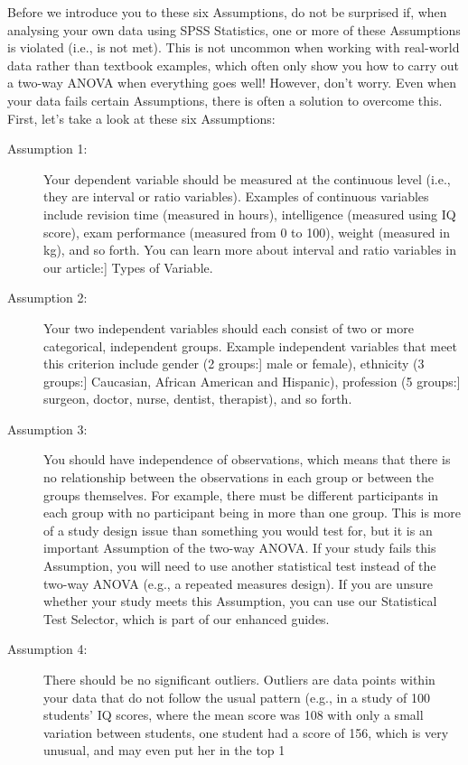 \documentclass[]{article}
\begin{document}
Before we introduce you to these six Assumptions, do not be surprised if, when analysing your own data using SPSS Statistics, one or more of these Assumptions is violated (i.e., is not met). This is not uncommon when working with real-world data rather than textbook examples, which often only show you how to carry out a two-way ANOVA when everything goes well! However, don’t worry. Even when your data fails certain Assumptions, there is often a solution to overcome this. First, let’s take a look at these six Assumptions:
\begin{description}
\item[ Assumption 1:] Your dependent variable should be measured at the continuous level (i.e., they are interval or ratio variables). Examples of continuous variables include revision time (measured in hours), intelligence (measured using IQ score), exam performance (measured from 0 to 100), weight (measured in kg), and so forth. You can learn more about interval and ratio variables in our article:] Types of Variable.
\item[ Assumption 2:] Your two independent variables should each consist of two or more categorical, independent groups. Example independent variables that meet this criterion include gender (2 groups:] male or female), ethnicity (3 groups:] Caucasian, African American and Hispanic), profession (5 groups:] surgeon, doctor, nurse, dentist, therapist), and so forth.
\item[ Assumption 3:] You should have independence of observations, which means that there is no relationship between the observations in each group or between the groups themselves. For example, there must be different participants in each group with no participant being in more than one group. This is more of a study design issue than something you would test for, but it is an important Assumption of the two-way ANOVA. If your study fails this Assumption, you will need to use another statistical test instead of the two-way ANOVA (e.g., a repeated measures design). If you are unsure whether your study meets this Assumption, you can use our Statistical Test Selector, which is part of our enhanced guides.
\item[ Assumption 4:] There should be no significant outliers. Outliers are data points within your data that do not follow the usual pattern (e.g., in a study of 100 students' IQ scores, where the mean score was 108 with only a small variation between students, one student had a score of 156, which is very unusual, and may even put her in the top 1%

\end{description}
\end{document}
